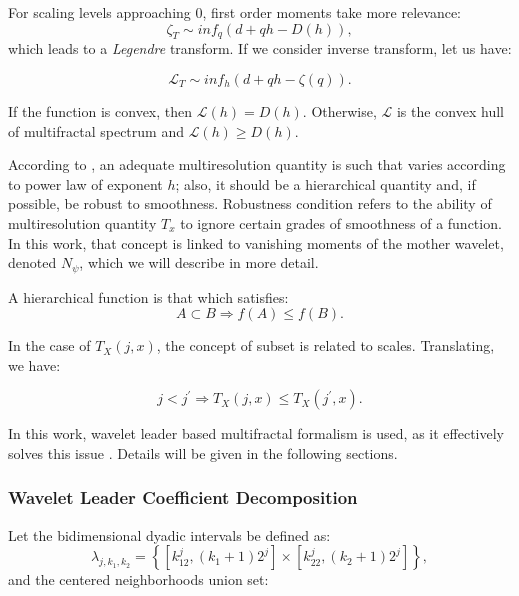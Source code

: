 \documentclass{article}
\begin{document}
For scaling levels approaching 0, first order moments take more relevance:
\begin{equation}
	\zeta_T \sim inf_q(d+qh - D(h)),
\end{equation}
which leads to a \textit{Legendre} transform. If we consider inverse transform, let us have:

\begin{equation}\label{legendre_inverse}
	\mathcal{L}_T \sim inf_h(d+qh-\zeta(q)).
\end{equation}

If the function is convex, then $\mathcal{L}(h)= D(h)$. Otherwise, $\mathcal{L}$ is the convex hull of multifractal spectrum and $\mathcal{L}(h)\geq D(h)$. 

According to \citep{leonarduzzi2014analisis}, an adequate multiresolution quantity is such that varies according to power law of exponent $h$; also, it should be a hierarchical quantity and, if possible, be robust to smoothness. Robustness condition refers to the ability of multiresolution quantity $T_x$ to ignore certain grades of smoothness of a function. In this work, that concept is linked to vanishing moments of the mother wavelet, denoted $N_{\psi}$, which we will describe in more detail.     

\begin{center}\label{hierarchical}
	A hierarchical function is that which satisfies:
	\begin{equation}
		A \subset B \Rightarrow f(A) \leq f(B).
	\end{equation}
\end{center}

In the case of $T_X(j, x)$, the concept of subset is related to scales. Translating, we have:

\begin{equation}
	j<j^{\prime} \Rightarrow T_X(j, x) \leq T_X(j^{\prime}, x). 
\end{equation}

In this work, wavelet leader based multifractal formalism is used, as it effectively solves this issue \citep{wendt2009wavelet} . Details will be given in the following sections. 

\subsubsection{Wavelet Leader Coefficient Decomposition}
Let the bidimensional dyadic intervals be defined as:
\begin{equation}
	\lambda_{j, k_1, k_2} = \left\lbrace \left[k_12^j, (k_1 + 1)2^j \right] \times \left[ k_22^j, (k_2 +1)2^j \right]  \right\rbrace, 
\end{equation}
and the centered neighborhoods union set:
\end{document}
